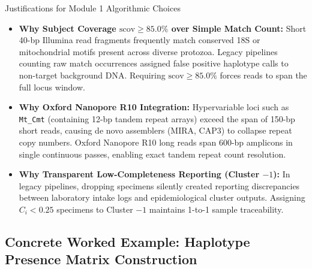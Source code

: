 \documentclass[11pt,a4paper]{article}
\begin{document}
\begin{conceptbox}{Justifications for Module 1 Algorithmic Choices}
\begin{itemize}[leftmargin=*]
    \item \textbf{Why Subject Coverage $\text{scov} \ge 85.0\%$ over Simple Match Count:} Short 40-bp Illumina read fragments frequently match conserved 18S or mitochondrial motifs present across diverse protozoa. Legacy pipelines counting raw match occurrences assigned false positive haplotype calls to non-target background DNA. Requiring $\text{scov} \ge 85.0\%$ forces reads to span the full locus window.
    \item \textbf{Why Oxford Nanopore R10 Integration:} Hypervariable loci such as \texttt{Mt\_Cmt} (containing 12-bp tandem repeat arrays) exceed the span of 150-bp short reads, causing de novo assemblers (MIRA, CAP3) to collapse repeat copy numbers. Oxford Nanopore R10 long reads span 600-bp amplicons in single continuous passes, enabling exact tandem repeat count resolution.
    \item \textbf{Why Transparent Low-Completeness Reporting (Cluster $-1$):} In legacy pipelines, dropping specimens silently created reporting discrepancies between laboratory intake logs and epidemiological cluster outputs. Assigning $C_i < 0.25$ specimens to Cluster $-1$ maintains 1-to-1 sample traceability.
\end{itemize}
\end{conceptbox}

\subsection{Concrete Worked Example: Haplotype Presence Matrix Construction}
\end{document}
